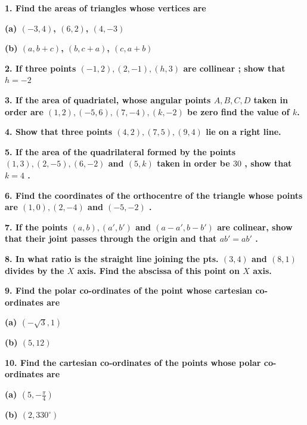 \documentclass{article}
\begin{document}
\begin{flushleft}


\textbf{1. Find the areas of triangles whose vertices are}\par
\textbf{(a) $(-3, 4)$, $(6, 2)$, $(4, -3)$}\par
\textbf{(b) $(a, b+c)$, $(b, c+a)$, $(c, a+b)$}\par
\vspace{0.2cm}
\textbf{2. If three points $(-1, 2), (2, -1),(h,3)$ are collinear ; show that $h=-2$}\par
\vspace{0.2cm}
\textbf{3. If the area of quadriatel, whose angular points $A, B, C, D$ taken in order are $(1,2),(-5,6),(7,-4),(k,-2)$ be zero find the value of $k$.}\par
\vspace{0.2cm}
\textbf{4. Show that three points $(4,2),(7,5),(9,4)$ lie on a right line.}\par
\vspace{0.2cm}
\textbf{5. If the area of the quadrilateral formed by the points $(1,3),(2,-5),(6,-2)$ and $(5,k)$ taken in order be $30$ , show that $k=4$ . }\par
\vspace{0.2cm}
\textbf{6. Find the coordinates of the orthocentre of the triangle whose points are $(1,0),(2,-4)$ and $(-5,-2)$ .}\par
\vspace{0.2cm}
\textbf{7. If the points $(a,b),(a',b')$ and $(a-a' , b-b')$ are colinear, show that their joint passes through the origin and that $ab'=ab'$ .}\par
\vspace{0.2cm}
\textbf{8. In what ratio is the straight line joining the pts. $(3,4)$ and $(8,1)$ divides by the $X$ axis. Find the abscissa of this point on $X$ axis.}\par
\vspace{0.2cm}
\textbf{9. Find the polar co-ordinates of the point whose cartesian co-ordinates are}\par
\textbf{(a) $(-\sqrt{3},1)$  }\par
\textbf{(b) $(5,12)$}\par
\vspace{0.2cm}
\textbf{10. Find the cartesian co-ordinates of the points whose polar co-ordinates are}\par
\textbf{(a) $(5, -\frac{\pi}{4})$}\par
\textbf{(b) $(2, 330^{\circ})$}\par

\end{flushleft}
\end{document}
